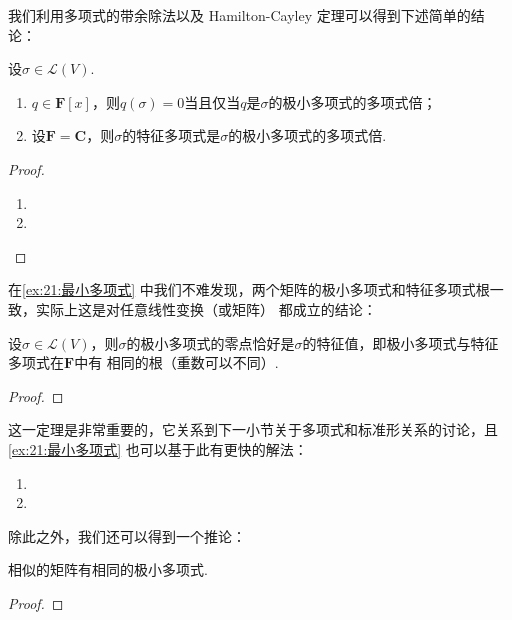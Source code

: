 我们利用多项式的带余除法以及 Hamilton-Cayley 定理可以得到下述简单的结论：
\begin{theorem}
    设$\sigma\in \mathcal{L}(V)$.
    \begin{enumerate}[label=(\arabic*)]
        \item $q\in\mathbf{F}[x]$，则$q(\sigma)=0$当且仅当$q$是$\sigma$的极小多项式的多项式倍；

        \item 设$\mathbf{F}=\mathbf{C}$，则$\sigma$的特征多项式是$\sigma$的极小多项式的多项式倍.
    \end{enumerate}
\end{theorem}
\begin{proof}
    \begin{enumerate}[label=(\arabic*)]
        \item 
        \item 
    \end{enumerate}
\end{proof}

在\autoref{ex:21:最小多项式} 中我们不难发现，两个矩阵的极小多项式和特征多项式根一致，实际上这是对任意线性变换（或矩阵）
都成立的结论：
\begin{theorem} \label{thm:21:极小多项式与特征多项式相同根}
    设$\sigma\in \mathcal{L}(V)$，则$\sigma$的极小多项式的零点恰好是$\sigma$的特征值，即极小多项式与特征多项式在$\mathbf{F}$中有
    相同的根（重数可以不同）.
\end{theorem}
\begin{proof}
    
\end{proof}

这一定理是非常重要的，它关系到下一小节关于多项式和标准形关系的讨论，且\autoref{ex:21:最小多项式} 也可以基于此有更快的解法：

\begin{solution}
    \begin{enumerate}
        \item 
        \item 
    \end{enumerate}
\end{solution}

除此之外，我们还可以得到一个推论：
\begin{corollary}
    相似的矩阵有相同的极小多项式.
\end{corollary}
\begin{proof}
    
\end{proof}

